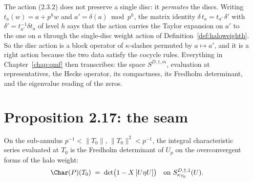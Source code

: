\begin{definition}
  \label{def:discforms}
  \leanok
  The action (2.3.2) does not preserve a single disc: it \emph{permutes} the discs.  Writing
  $t_a(w) = a+p^{h}w$ and $a' = \delta(a)\bmod p^{h}$, the matrix identity
  $\delta\, t_a = t_{a'}\,\delta'$ with $\delta' = t_{a'}^{-1}\delta t_a$ of level $h$ says that
  the action carries the Taylor expansion on $a'$ to the one on $a$ through the single-disc
  weight action of Definition~\ref{def:haloweighth}.  So the disc action is a block operator of
  $\kappa$-slashes permuted by $a\mapsto a'$, and it is a right action because the two data
  satisfy the cocycle rules.  Everything in Chapter~\ref{chap:qmf} then transcribes: the space
  $S^{D,\dagger,m}$, evaluation at representatives, the Hecke operator, its compactness, its
  Fredholm determinant, and the eigenvalue reading of the zeros.
\end{definition}

\section{Proposition 2.17: the seam}
\label{sec:seam}

\begin{theorem}[{\cite[Proposition 2.17]{LWX}} at $m=1$]
  \label{thm:lwx-prop217}
  \leanok
  On the sub-annulus $p^{-1}<\lVert T_0\rVert$, $\lVert T_0\rVert^{2}<p^{-1}$, the integral
  characteristic series evaluated at $T_0$ is the Fredholm determinant of $U_p$ on the
  overconvergent forms of the halo weight:
  \[
    \Char(P)(T_0) \;=\; \det\bigl(1 - X\,[U\eta U]\bigr)
    \quad\text{on } S^{D,\dagger,1}_{\kappa_{T_0}}(U).
  \]
\end{theorem}

